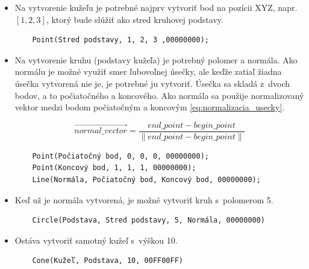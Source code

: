 \begin{itemize}
    \item Na vytvorenie kužeľu je potrebné najprv vytvoriť bod na pozícii XYZ, napr. $\left [ 1, 2, 3 \right ]$, ktorý bude slúžiť ako stred kruhovej podstavy.
	\begin{lstlisting}
	Point(Stred podstavy, 1, 2, 3 ,00000000);
	\end{lstlisting}
	\item Na vytvorenie kruhu (podstavy kužeľa) je potrebný polomer a normála. Ako normálu je možné využiť smer ľubovoľnej úsečky, ale keďže zatiaľ žiadna úsečka vytvorená nie je, je potrebné ju vytvoriť. Úsečka sa skladá z~dvoch bodov, a to počiatočného a koncového. Ako normála sa použije normalizovaný vektor medzi bodom počiatočným a koncovým \ref{eq:normalizacia_usecky}.

	\begin{equation}
		\overrightarrow{normal\_vector}=
		\frac{end\_point - begin\_point}{
		\left \|  end\_point - begin\_point \right \|}
	\label{eq:normalizacia_usecky}
	\end{equation}

	\begin{lstlisting}
	Point(Počiatočný bod, 0, 0, 0, 00000000);
	Point(Koncový bod, 1, 1, 1, 00000000);
	Line(Normála, Počiatočný bod, Koncový bod, 00000000);
	\end{lstlisting}
	\item Keď už je normála vytvorená, je možné vytvoriť kruh s~polomerom 5.
	\begin{lstlisting}
	Circle(Podstava, Stred podstavy, 5, Normála, 00000000) 
	\end{lstlisting}
	\item Ostáva vytvoriť samotný kužeľ s~výškou 10.
	\begin{lstlisting}
	Cone(Kužeľ, Podstava, 10, 00FF00FF)
	\end{lstlisting}
\end{itemize}


